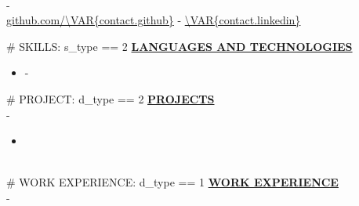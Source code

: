 \documentclass{article}
\begin{document}
\begin{center}
\thispagestyle{empty}
\Large \textbf{ } \\
\normalsize 
    -  \\
    \url{github.com/\VAR{contact.github}}
    - \url{\VAR{contact.linkedin}}
~\\\hrulefill
\end{center}
\#{ SKILLS: s_type == 2 } 
\noindent \textbf{\underline{LANGUAGES AND TECHNOLOGIES}} 
\begin{itemize}[noitemsep,nolistsep,leftmargin=*]
    \item \textbf{} - 
\end{itemize}
\#{ PROJECT: d_type == 2 }              
\noindent \textbf{\underline{PROJECTS}} \\
\noindent \textbf{} \hfill {} - \\
\textit{} %
\begin{itemize}[noitemsep,nolistsep,leftmargin=*]
    \item \textbf{} 
\end{itemize}
        ~\\
\#{ WORK EXPERIENCE: d_type == 1 }
\noindent \textbf{\underline{WORK EXPERIENCE}} \\
\noindent \textbf{} \hfill {} - \\
\textit{} \hfill \textit{} %
\end{document}
